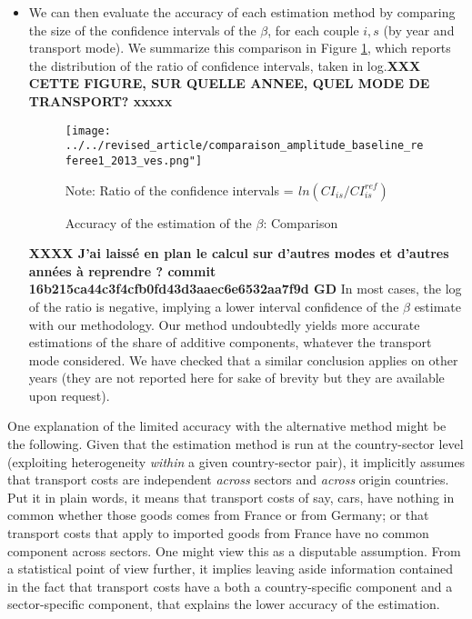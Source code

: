 \documentclass[a4paper,11pt]{article}
\begin{document}
\begin{itemize}
\begin{enumerate}
\begin{table}[htbp]
\begin{itemize}
\begin{itemize}
    \item We can then evaluate the accuracy of each estimation method by comparing the size of the confidence intervals of the $\beta$, for each couple $i,s$ (by year and transport mode). We summarize this comparison in Figure \ref{fig:accuracy_beta}, which reports the distribution of the ratio of confidence intervals, taken in log.\textbf{XXX CETTE FIGURE, SUR QUELLE ANNEE, QUEL MODE DE TRANSPORT? xxxxx}


    \begin{figure}[htbp]
    \caption{Accuracy of the estimation of the $\beta$: Comparison}
    \label{fig:accuracy_beta}
    \begin{center}
    \texttt{[image: ../../revised\_article/comparaison\_amplitude\_baseline\_referee1\_2013\_ves.png"]}
    \begin{minipage} [c]  {5in} \scriptsize%
    	    Note: Ratio of the confidence intervals = $ _{}ln(CI_{is}/CI^{ref}_{is})$
    \end{minipage}

    \end{center}
    \end{figure}

   \textbf{XXXX J’ai laissé en plan le calcul sur d’autres modes et d’autres années à reprendre ? commit 16b215ca44c3f4cfb0fd43d3aaec6e6532aa7f9d  GD} In most cases, the log of the ratio is negative, implying a lower interval confidence of the $\beta$ estimate with our methodology. Our method undoubtedly yields more accurate estimations of the share of additive components, whatever the transport mode considered. We have checked that a similar conclusion applies on other years (they are not reported here for sake of brevity but they are available upon request).
    \end{itemize}

One explanation of the limited accuracy with the alternative method might be the following. Given that the estimation method is run at the country-sector level (exploiting heterogeneity \textit{within} a given country-sector pair), it implicitly assumes that transport costs are independent \textit{across} sectors and \textit{across} origin countries. Put it in plain words, it means that transport costs of say, cars, have nothing in common whether those goods comes from France or from Germany; or that transport costs that apply to imported goods from France have no common component across sectors. One might view this as a disputable assumption. From a statistical point of view further, it implies leaving aside information contained in the fact that transport costs have a both a country-specific component and a sector-specific component, that explains the lower accuracy of the estimation.



\end{itemize}
\end{table}
\end{enumerate}
\end{itemize}
\end{document}
